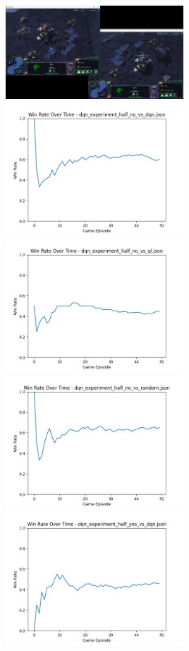 \includegraphics[width=0.5\textwidth]{images/sc2env.png} 
\includegraphics[width=0.5\textwidth]{images/win_rate_dqn_experiment_half_no_vs_dqn.png} 
\includegraphics[width=0.5\textwidth]{images/win_rate_dqn_experiment_half_no_vs_ql.png} 
\includegraphics[width=0.5\textwidth]{images/win_rate_dqn_experiment_half_no_vs_random.png} 
\includegraphics[width=0.5\textwidth]{images/win_rate_dqn_experiment_half_yes_vs_dqn.png} 
